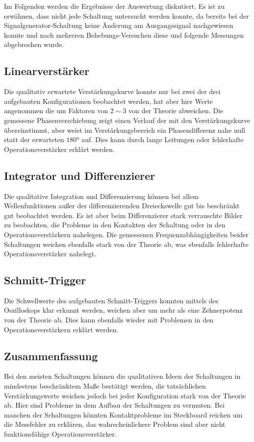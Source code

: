 Im Folgenden werden die Ergebnisse der Auswertung diskutiert. Es ist zu erwähnen, dass nicht jede Schaltung untersucht werden konnte, da bereits bei der Signalgenerator-Schaltung keine Änderung am Ausgangssignal nachgewiesen konnte und nach mehreren Behebungs-Versuchen diese und folgende Messungen abgebrochen wurde.

\subsection{Linearverstärker}
Die qualitativ erwartete Verstärkungskurve konnte nur bei zwei der drei aufgebauten Konfigurationen beobachtet werden, hat aber hier Werte angenommen die um Faktoren von $2\sim 3$ von der Theorie abweichen. Die gemessene Phasenverschiebung zeigt einen Verlauf der mit den Verstärkungskurve übereinstimmt, aber weist im Verstärkungsbereich ein Phasendifferenz nahe null statt der erwarteten $180$° auf. Dies kann durch lange Leitungen oder fehlerhafte Operationsverstärker erklärt werden.

\subsection{Integrator und Differenzierer}
Die qualitative Integration und Differenzierung können bei allem Wellenfunktionen außer der differenzierenden Dreieckswelle gut bis beschränkt gut beobachtet werden. Es ist aber beim Differenzierer stark verrauschte Bilder zu beobachten, die Probleme in den Kontakten der Schaltung oder in den Operationsverstärkern nahelegen. Die gemessenen Frequenzabhängigkeiten beider Schaltungen weichen ebenfalls stark von der Theorie ab, was ebenfalls fehlerhafte Operationsverstärker nahelegt.

\subsection{Schmitt-Trigger}
Die Schwellwerte des aufgebauten Schmitt-Triggers konnten mittels des Oszilloskops klar erkannt werden, weichen aber um mehr als eine Zehnerpotenz von der Theorie ab. Dies kann ebenfalls wieder mit Problemen in den Operationsverstärkern erklärt werden.

\subsection{Zusammenfassung}
Bei den meisten Schaltungen können die qualitativen Ideen der Schaltungen in mindestens beschränktem Maße bestätigt werden, die tatsächlichen Verstärkungswerte weichen jedoch bei jeder Konfiguration stark von der Theorie ab. Hier sind Probleme in dem Aufbau der Schaltungen zu vermuten. Bei manchen der Schaltungen könnten Kontaktprobleme im Steckboard reichen um die Messfehler zu erklären, das wahrscheinlichere Problem sind aber nicht funktionsfähige Operationsverstärker.